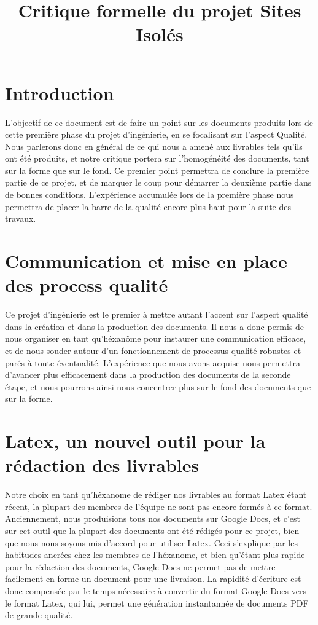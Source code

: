 \documentclass[a4paper]{article}
\begin{document}
\title{Critique formelle du projet Sites Isolés}
\maketitle

\section{Introduction}

L'objectif de ce document est de faire un point sur les documents produits lors de cette première phase du projet d'ingénierie, en se focalisant sur l'aspect Qualité. Nous parlerons donc en général de ce qui nous a amené aux livrables tels qu'ils ont été produits, et notre critique portera sur l'homogénéité des documents, tant sur la forme que sur le fond. Ce premier point permettra de conclure la première partie de ce projet, et de marquer le coup pour démarrer la deuxième partie dans de bonnes conditions. L'expérience accumulée lors de la première phase nous permettra de placer la barre de la qualité encore plus haut pour la suite des travaux.

\section{Communication et mise en place des process qualité}

Ce projet d'ingénierie est le premier à mettre autant l'accent sur l'aspect qualité dans la création et dans la production des documents. Il nous a donc permis de nous organiser en tant qu'héxanôme pour instaurer une communication efficace, et de nous souder autour d'un fonctionnement de processus qualité robustes et parés à toute éventualité. L'expérience que nous avons acquise nous permettra d'avancer plus efficacement dans la production des documents de la seconde étape, et nous pourrons ainsi nous concentrer plus sur le fond des documents que sur la forme.

\section{Latex, un nouvel outil pour la rédaction des livrables}

Notre choix en tant qu'héxanome de rédiger nos livrables au format Latex étant récent, la plupart des membres de l'équipe ne sont pas encore formés à ce format. Anciennement, nous produisions tous nos documents sur Google Docs, et c'est sur cet outil que la plupart des documents ont été rédigés pour ce projet, bien que nous nous soyons mis d'accord pour utiliser Latex. Ceci s'explique par les habitudes ancrées chez les membres de l'héxanome, et bien qu'étant plus rapide pour la rédaction des documents, Google Docs ne permet pas de mettre facilement en forme un document pour une livraison. La rapidité d'écriture est donc compensée par le temps nécessaire à convertir du format Google Docs vers le format Latex, qui lui, permet une génération instantannée de documents PDF de grande qualité.
\end{document}
